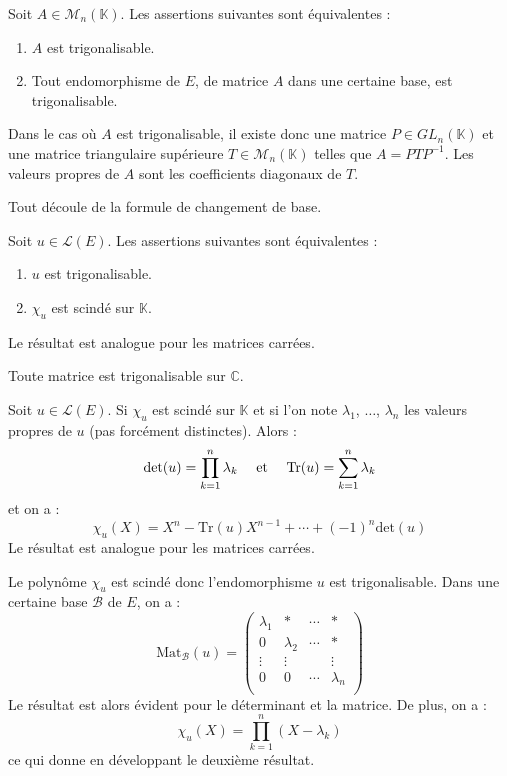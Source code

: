 \documentclass[french,11pt,twoside]{VcCours}
\begin{document}
 \begin{Theoreme}{} Soit $A \in \mathcal{M}_n(\mathbb{K})$. Les assertions suivantes sont équivalentes :
 
 \begin{enumerate}
 \item $A$ est trigonalisable.
 \item Tout endomorphisme de $E$, de matrice $A$ dans une certaine base, est trigonalisable.
 \end{enumerate}
 Dans le cas où $A$ est trigonalisable, il existe donc une matrice $P \in GL_n(\mathbb{K})$ et une matrice triangulaire supérieure $T \in \mathcal{M}_n(\mathbb{K})$ telles que $A=PTP^{-1}$. Les valeurs propres de $A$ sont les coefficients diagonaux de $T$.
\end{Theoreme}

\begin{Demonstration}{} Tout découle de la formule de changement de base. 
\end{Demonstration}

\begin{Theoreme}{} Soit $u \in \mathcal{L}(E)$. Les assertions suivantes sont équivalentes :

\begin{enumerate}
\item $u$ est trigonalisable.
\item $\chi_u$ est scindé sur $\mathbb{K}$.
\end{enumerate}
Le résultat est analogue pour les matrices carrées.
\end{Theoreme}

\begin{Corollaire}{} Toute matrice est trigonalisable sur $\mathbb{C}$.
\end{Corollaire}

\begin{Proposition}{} Soit $u \in \mathcal{L}(E)$. Si $\chi_u$ est scindé sur $\mathbb{K}$ et si l'on note $\lambda_1$, $\ldots$, $\lambda_n$ les valeurs propres de $u$ (pas forcément distinctes). Alors :
$$ \textrm{det}(u) = \prod_{k=1}^n \lambda_k \quad \hbox{ et }  \quad \textrm{Tr}(u) = \sum_{k=1}^n \lambda_k $$
et on a :
$$ \chi_u(X) = X^n - \textrm{Tr}(u) X^{n-1} + \cdots + (-1)^n \textrm{det}(u)$$
Le résultat est analogue pour les matrices carrées.
\end{Proposition}

\begin{Demonstration}{} Le polynôme $\chi_u$ est scindé donc l'endomorphisme $u$ est trigonalisable. Dans une certaine base $\mathcal{B}$ de $E$, on a :
$$ \textrm{Mat}_{\mathcal{B}}(u) = \begin{pmatrix}
\lambda_1 & * & \cdots & * \\
0 & \lambda_2 & \cdots & * \\
\vdots & \vdots & & \vdots \\
0 & 0 & \cdots & \lambda_n \\
\end{pmatrix}$$
Le résultat est alors évident pour le déterminant et la matrice. De plus, on a :
$$ \chi_u(X) = \prod_{k=1}^n (X- \lambda_k)$$
ce qui donne en développant le deuxième résultat.
\end{Demonstration}
\end{document}
